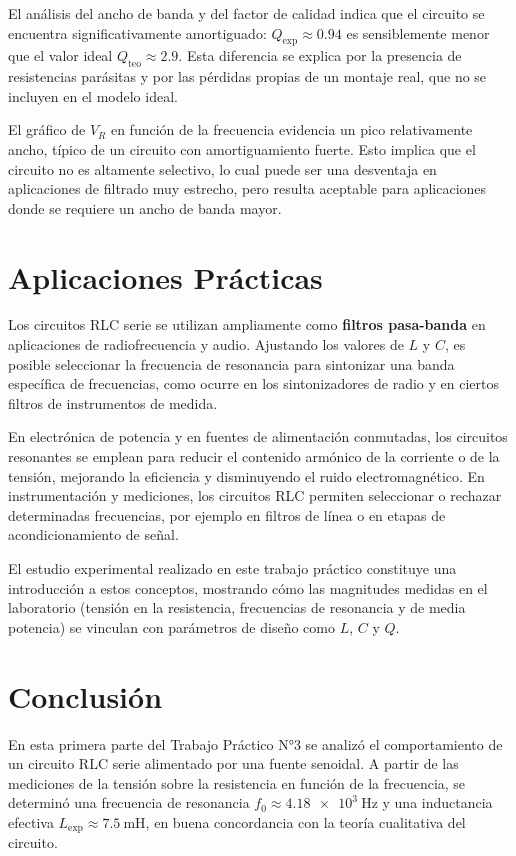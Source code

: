 \documentclass[a4paper,12pt]{article}
\begin{document}
El análisis del ancho de banda y del factor de calidad indica que el circuito se encuentra significativamente amortiguado: \( Q_{\text{exp}} \approx 0.94 \) es sensiblemente menor que el valor ideal \( Q_{\text{teo}} \approx 2.9 \). Esta diferencia se explica por la presencia de resistencias parásitas y por las pérdidas propias de un montaje real, que no se incluyen en el modelo ideal.

El gráfico de \( V_R \) en función de la frecuencia evidencia un pico relativamente ancho, típico de un circuito con amortiguamiento fuerte. Esto implica que el circuito no es altamente selectivo, lo cual puede ser una desventaja en aplicaciones de filtrado muy estrecho, pero resulta aceptable para aplicaciones donde se requiere un ancho de banda mayor.

\section{Aplicaciones Prácticas}
Los circuitos RLC serie se utilizan ampliamente como \textbf{filtros pasa-banda} en aplicaciones de radiofrecuencia y audio. Ajustando los valores de \( L \) y \( C \), es posible seleccionar la frecuencia de resonancia para sintonizar una banda específica de frecuencias, como ocurre en los sintonizadores de radio y en ciertos filtros de instrumentos de medida.

En electrónica de potencia y en fuentes de alimentación conmutadas, los circuitos resonantes se emplean para reducir el contenido armónico de la corriente o de la tensión, mejorando la eficiencia y disminuyendo el ruido electromagnético. En instrumentación y mediciones, los circuitos RLC permiten seleccionar o rechazar determinadas frecuencias, por ejemplo en filtros de línea o en etapas de acondicionamiento de señal.

El estudio experimental realizado en este trabajo práctico constituye una introducción a estos conceptos, mostrando cómo las magnitudes medidas en el laboratorio (tensión en la resistencia, frecuencias de resonancia y de media potencia) se vinculan con parámetros de diseño como \( L \), \( C \) y \( Q \).

\section{Conclusión}
En esta primera parte del Trabajo Práctico N°3 se analizó el comportamiento de un circuito RLC serie alimentado por una fuente senoidal. A partir de las mediciones de la tensión sobre la resistencia en función de la frecuencia, se determinó una frecuencia de resonancia \( f_0 \approx \SI{4.18e3}{\hertz} \) y una inductancia efectiva \( L_{\text{exp}} \approx \SI{7.5}{\milli\henry} \), en buena concordancia con la teoría cualitativa del circuito.
\end{document}
